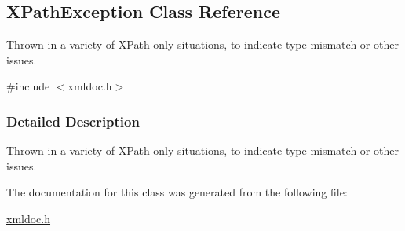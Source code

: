 \hypertarget{classXPathException}{
\subsection{XPathException Class Reference}
\label{classXPathException}
}


Thrown in a variety of XPath only situations, to indicate type mismatch or other issues.  




{\ttfamily \#include $<$xmldoc.h$>$}



\subsubsection{Detailed Description}
Thrown in a variety of XPath only situations, to indicate type mismatch or other issues. 

The documentation for this class was generated from the following file:\begin{DoxyCompactItemize}
\item 
\hyperlink{xmldoc_8h}{xmldoc.h}\end{DoxyCompactItemize}
